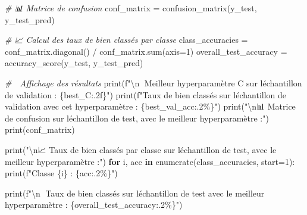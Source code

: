 \documentclass[
]{article}
\newenvironment{Shaded}{}{}
\newcommand{\BuiltInTok}[1]{\textcolor[rgb]{0.00,0.50,0.00}{#1}}
\newcommand{\CharTok}[1]{\textcolor[rgb]{0.25,0.44,0.63}{#1}}
\newcommand{\CommentTok}[1]{\textcolor[rgb]{0.38,0.63,0.69}{\textit{#1}}}
\newcommand{\ControlFlowTok}[1]{\textcolor[rgb]{0.00,0.44,0.13}{\textbf{#1}}}
\newcommand{\DecValTok}[1]{\textcolor[rgb]{0.25,0.63,0.44}{#1}}
\newcommand{\KeywordTok}[1]{\textcolor[rgb]{0.00,0.44,0.13}{\textbf{#1}}}
\newcommand{\NormalTok}[1]{#1}
\newcommand{\OperatorTok}[1]{\textcolor[rgb]{0.40,0.40,0.40}{#1}}
\newcommand{\SpecialCharTok}[1]{\textcolor[rgb]{0.25,0.44,0.63}{#1}}
\newcommand{\SpecialStringTok}[1]{\textcolor[rgb]{0.73,0.40,0.53}{#1}}
\newcommand{\StringTok}[1]{\textcolor[rgb]{0.25,0.44,0.63}{#1}}
\begin{document}
\begin{Shaded}
\begin{Highlighting}[]
\CommentTok{\# 📊 Matrice de confusion}
\NormalTok{conf\_matrix }\OperatorTok{=}\NormalTok{ confusion\_matrix(y\_test, y\_test\_pred)}

\CommentTok{\# 📈 Calcul des taux de bien classés par classe}
\NormalTok{class\_accuracies }\OperatorTok{=}\NormalTok{ conf\_matrix.diagonal() }\OperatorTok{/}\NormalTok{ conf\_matrix.}\BuiltInTok{sum}\NormalTok{(axis}\OperatorTok{=}\DecValTok{1}\NormalTok{)}
\NormalTok{overall\_test\_accuracy }\OperatorTok{=}\NormalTok{ accuracy\_score(y\_test, y\_test\_pred)}

\CommentTok{\# 📝 Affichage des résultats}
\BuiltInTok{print}\NormalTok{(}\SpecialStringTok{f"}\CharTok{\textbackslash{}n}\SpecialStringTok{🔹 Meilleur hyperparamètre C sur l\textquotesingle{}échantillon de validation : }\SpecialCharTok{\{}\NormalTok{best\_C}\SpecialCharTok{:.2f\}}\SpecialStringTok{"}\NormalTok{)}
\BuiltInTok{print}\NormalTok{(}\SpecialStringTok{f"Taux de bien classés sur l\textquotesingle{}échantillon de validation avec cet hyperparamètre : }\SpecialCharTok{\{}\NormalTok{best\_val\_acc}\SpecialCharTok{:.2\%\}}\SpecialStringTok{"}\NormalTok{)}
\BuiltInTok{print}\NormalTok{(}\StringTok{"}\CharTok{\textbackslash{}n}\StringTok{📊 Matrice de confusion sur l\textquotesingle{}échantillon de test, avec le meilleur hyperparamètre :"}\NormalTok{)}
\BuiltInTok{print}\NormalTok{(conf\_matrix)}

\BuiltInTok{print}\NormalTok{(}\StringTok{"}\CharTok{\textbackslash{}n}\StringTok{📈 Taux de bien classés par classe sur l\textquotesingle{}échantillon de test, avec le meilleur hyperparamètre  :"}\NormalTok{)}
\ControlFlowTok{for}\NormalTok{ i, acc }\KeywordTok{in} \BuiltInTok{enumerate}\NormalTok{(class\_accuracies, start}\OperatorTok{=}\DecValTok{1}\NormalTok{):}
    \BuiltInTok{print}\NormalTok{(}\SpecialStringTok{f"Classe }\SpecialCharTok{\{}\NormalTok{i}\SpecialCharTok{\}}\SpecialStringTok{ : }\SpecialCharTok{\{}\NormalTok{acc}\SpecialCharTok{:.2\%\}}\SpecialStringTok{"}\NormalTok{)}

\BuiltInTok{print}\NormalTok{(}\SpecialStringTok{f"}\CharTok{\textbackslash{}n}\SpecialStringTok{🔹 Taux de bien classés sur l\textquotesingle{}échantillon de test avec le meilleur hyperparamètre : }\SpecialCharTok{\{}\NormalTok{overall\_test\_accuracy}\SpecialCharTok{:.2\%\}}\SpecialStringTok{"}\NormalTok{)}
\end{Highlighting}
\end{Shaded}
\end{document}

